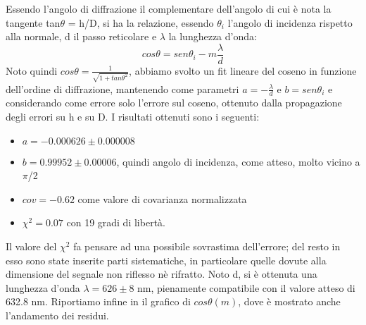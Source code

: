 Essendo l'angolo di diffrazione il complementare dell'angolo di cui è nota la tangente tan$\theta$ = h/D, si ha la relazione, essendo $\theta_i$ l'angolo di incidenza rispetto alla normale, d il passo reticolare e $\lambda$ la lunghezza d'onda:
\begin{equation}
cos\theta = sen\theta_i - m \frac{\lambda}{d}
\label{legge_diffrazione}
\end{equation}
Noto quindi $cos\theta = \frac {1}{\sqrt{1+tan\theta ^2}}$, abbiamo svolto un fit lineare del coseno in funzione dell'ordine di diffrazione, mantenendo come parametri $a = -\frac{\lambda}{d}$ e $b = sen\theta_i$ e considerando come errore solo l'errore sul coseno, ottenuto dalla propagazione degli errori su h e su D. I risultati ottenuti sono i seguenti:
\begin{itemize}
\item $a = -0.000626 \pm 0.000008$
\item $b = 0.99952 \pm 0.00006$, quindi angolo di incidenza, come atteso, molto vicino a $\pi$/2
\item $cov = -0.62$ come valore di covarianza normalizzata
\item $\chi^2 = 0.07$ con 19 gradi di libertà.
\end{itemize}
Il valore del $\chi^2$ fa pensare ad una possibile sovrastima dell'errore; del resto in esso sono state inserite parti sistematiche, in particolare quelle dovute alla dimensione del segnale non riflesso nè rifratto. Noto d, si è ottenuta una lunghezza d'onda $\lambda = 626 \pm 8$ nm, pienamente compatibile con il valore atteso di 632.8 nm. Riportiamo infine in  il grafico di $cos\theta (m)$, dove è mostrato anche l'andamento dei residui.


